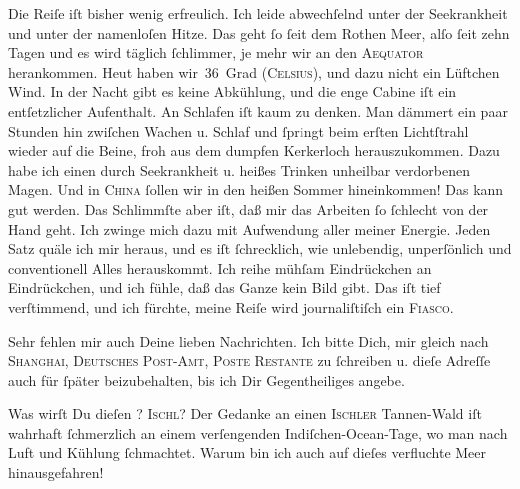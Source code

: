 \pstart
           Die Reiſe iſt bisher wenig erfreulich. Ich leide abwechſelnd unter der Seekrankheit
               und unter der namenloſen Hitze. Das geht{ }ſo{ }ſeit dem Rothen Meer, alſo{ }ſeit zehn Tagen {\pb}und es wird täglich{ }ſchlimmer, je mehr wir an den
                  \textsc{Aequator} herankommen. Heut haben wir 36 Grad (\textsc{Celsius}), und dazu nicht
               ein Lüftchen Wind. In der Nacht gibt es keine Abkühlung, und die enge Cabine iſt ein
               entſetzlicher Aufenthalt. An Schlafen iſt kaum zu denken. Man dämmert ein paar
               Stunden hin zwiſchen Wachen u. Schlaf und{ }ſpr\textcolor{gray}{i}ngt beim erſten
               Lichtſtrahl wieder auf die Beine, froh aus {\pb}dem
               dumpfen Kerkerloch herauszukommen. Dazu habe ich einen \strikeout{\textcolor{gray}{du}} durch Seekrankheit u. heißes Trinken unheilbar verdorbenen Magen. Und in \textsc{China}{ }ſollen wir in den heißen Sommer hineinkommen! Das kann gut werden. Das
               Schlimmſte aber iſt, daß mir das Arbeiten{ }ſo{ }ſchlecht von der Hand geht. Ich zwinge
               mich dazu mit Aufwendung aller meiner Energie. {\pb}Jeden Satz quäle ich mir heraus, und es iſt{ }ſchrecklich, wie unlebendig,
               unperſönlich und conventionell Alles herauskommt. Ich reihe mühſam Eindrückchen an
               Eindrückchen, und ich fühle, daß das Ganze kein Bild gibt. Das iſt tief verſtimmend,
               und ich fürchte, meine Reiſe wird journaliſtiſch ein \textsc{Fiasco}.\pend
           
\pstart
           Sehr fehlen mir auch Deine lieben Nachrichten. Ich bitte Dich, mir gleich {\pb}nach \textsc{Shanghai}, \textsc{Deutsches Post-Amt, Poste Restante} zu{ }ſchreiben u. dieſe Adreſſe auch für{ }ſpäter beizubehalten, bis ich Dir Gegentheiliges
               angebe.\pend
           
\pstart
           Was wirſt Du dieſen \label{K_L02846-1v}\label{K_L02846-1}? \textsc{Ischl}? Der Gedanke an einen \textsc{Ischler} Tannen-Wald  iſt {\pb}wahrhaft{ }ſchmerzlich an einem verſengenden
                  Indiſchen-Ocean-Tage, wo man nach Luft und
               Kühlung{ }ſchmachtet. Warum bin ich auch auf dieſes verfluchte Meer hinausgefahren!\pend
           
